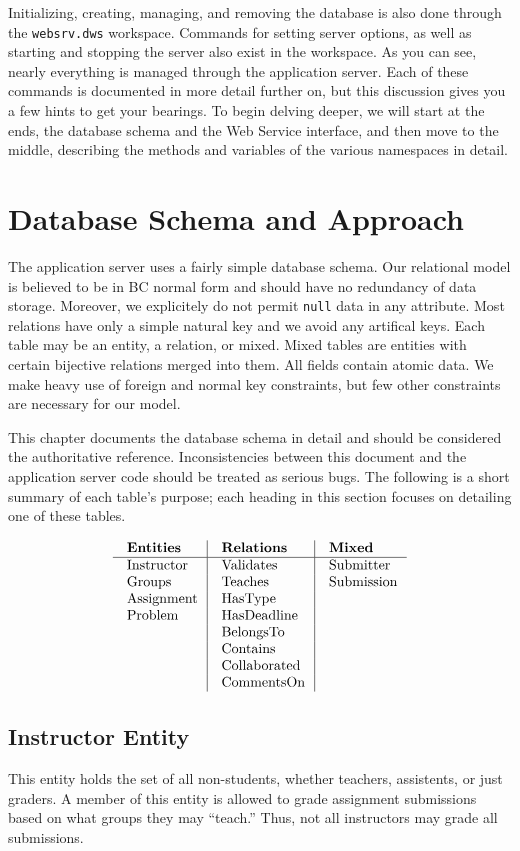 Initializing, creating, managing, and removing the database is also done through
the {\tt websrv.dws} workspace.  Commands for setting server options, as well as
starting and stopping the server also exist in the workspace.  As you can see, 
nearly everything is managed through the application server.  Each of these 
commands is documented in more detail further on, but this discussion gives you 
a few hints to get your bearings.
To begin delving deeper, we will start at the ends, the database schema and 
the Web Service interface, and then move to the middle, describing the methods 
and variables of the various namespaces in detail.

\section{Database Schema and Approach}

\noindent
The application server uses a fairly simple database schema.
Our relational model is believed to be in BC normal form and 
should have no redundancy of data storage.
Moreover, we explicitely do not permit {\tt null} data in any attribute.
Most relations have only a simple natural key and we avoid any 
artifical keys. Each table may be an entity, a relation, or mixed. 
Mixed tables are entities with certain bijective relations merged into them.
All fields contain atomic data.
We make heavy use of foreign and normal key constraints, 
but few other constraints are necessary for our model.

This chapter documents the database schema in detail and should be 
considered the authoritative reference. 
Inconsistencies between this document and the application server code should be 
treated as serious bugs. The following is a short summary of each table's 
purpose; each heading in this section focuses on detailing one of these tables.

$$\vbox{
  \offinterlineskip
  \halign{
    \strut \quad #  & \vrule\quad #  & \vrule\quad # \cr
    {\bf Entities}  & {\bf Relations}  & {\bf Mixed}\cr
    \noalign{\hrule}    
    Instructor  & Validates  & Submitter \cr
    Groups  & Teaches  & Submission \cr
    Assignment  & HasType  & \cr
    Problem  & HasDeadline  & \cr
      & BelongsTo  & \cr
      & Contains  & \cr
      & Collaborated  & \cr
      & CommentsOn  & \cr
  }
}$$

\subsection{Instructor Entity}
This entity holds the set of all non-students, 
whether teachers, assistents, or just graders.
A member of this entity is allowed to grade assignment submissions
based on what groups they may ``teach.''
Thus, not all instructors may grade all submissions.

